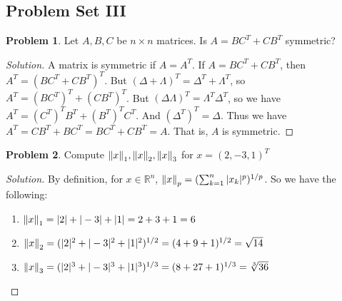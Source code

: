 \documentclass[oneside]{book}
\theoremstyle{definition}
\newtheorem{problem}{Problem}[section]
\begin{document}
\subsection*{Problem Set III}

\begin{problem}
Let $A,B,C$ be $n\times n$ matrices. Is $A = BC^T + CB^T$ symmetric?
\end{problem}
\begin{proof}[Solution]
A matrix is symmetric if $A = A^T$. If $A = BC^T+CB^T$, then $A^T = (BC^T+CB^T)^T$. But $(\Delta+\Lambda)^T = \Delta^T + \Lambda^T$, so $A^T = (BC^T)^T + (CB^T)^T$. But $(\Delta \Lambda)^T = \Lambda^T \Delta^T$, so we have $A^T = (C^T)^TB^T + (B^T)^TC^T$. And $(\Delta^T)^T=\Delta$. Thus we have $A^T = CB^T + BC^T = BC^T + CB^T = A$. That is, $A$ is symmetric.
\end{proof}

\begin{problem}
Compute $\norm{x}_1, \norm{x}_2, \norm{x}_3$ for $x = (2,-3,1)^T$
\end{problem}
\begin{proof}[Solution]
By definition, for $x\in \mathbb{R}^n$, $\norm{x}_p = (\sum_{k=1}^{n}|x_k|^p)^{1/p}$. So we have the following:
\begin{enumerate}
\item $\norm{x}_1 = |2|+|-3|+|1| = 2+3+1 = 6$
\item $\norm{x}_2 = (|2|^2+|-3|^2+|1|^2)^{1/2} = (4+9+1)^{1/2} = \sqrt{14}$
\item $\norm{x}_3 = (|2|^3+|-3|^3+|1|^3)^{1/3} = (8+27+1)^{1/3} = \sqrt[3]{36}$
\end{enumerate}
\end{proof}
\end{document}
